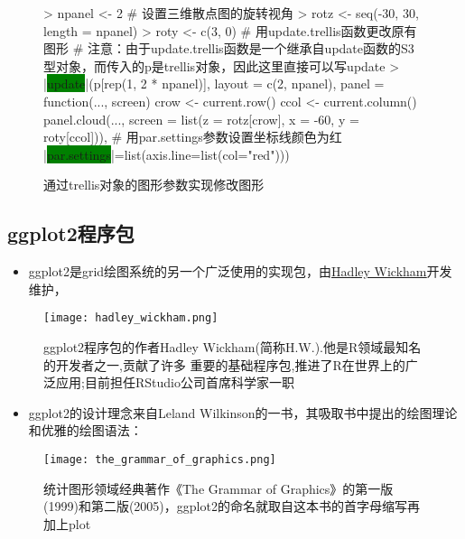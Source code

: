 \begin{frame}[t,fragile]{\subsecname}{\subsubsecname}
\begin{overlayarea}{\textwidth}{\textheight}
\begin{onlyenv}
\begin{figure}
\begin{columns}
    \begin{column}[c]{.6\textwidth}
\begin{rcode}
> npanel <- 2
# 设置三维散点图的旋转视角
> rotz <- seq(-30, 30, length = npanel)
> roty <- c(3, 0)
# 用update.trellis函数更改原有图形
# 注意：由于update.trellis函数是一个继承自update函数的S3型对象，而传入的p是trellis对象，因此这里直接可以写update
> |\colorbox{green}{update}|(p[rep(1, 2 * npanel)], 
         layout = c(2, npanel),
         panel = function(..., screen) {
           crow <- current.row()
           ccol <- current.column()
         panel.cloud(..., screen = list(z = rotz[crow], x = -60, y = roty[ccol]))},
         # 用par.settings参数设置坐标线颜色为红 
         |\colorbox{green}{par.settings}|=list(axis.line=list(col="red")))
\end{rcode}
    \end{column}
  \end{columns}
  \caption{通过trellis对象的图形参数实现修改图形}
\end{figure}
\end{onlyenv}
\end{overlayarea}
\end{frame}


\subsection{ggplot2程序包}
\begin{frame}[t]{\subsecname}{}
\begin{itemize}
\item ggplot2是grid绘图系统的另一个广泛使用的实现包，由\href{http://hadley.nz/}{\uline{Hadley Wickham}}开发维护， 
\end{itemize}
\begin{figure}[ht]
  \centering
  \texttt{[image: hadley\_wickham.png]}
  \caption{ggplot2程序包的作者Hadley Wickham(简称H.W.).他是R领域最知名的开发者之一,贡献了许多
重要的基础程序包,推进了R在世界上的广泛应用;目前担任RStudio公司首席科学家一职}
\end{figure}
\end{frame}

\begin{frame}[t]{\subsecname}{}
\begin{itemize}
\item ggplot2的设计理念来自Leland Wilkinson的一书，其吸取书中提出的绘图理论和优雅的绘图语法：
\end{itemize}
\begin{figure}[ht]
  \centering
  \texttt{[image: the\_grammar\_of\_graphics.png]}
  \caption{统计图形领域经典著作《The Grammar of Graphics》的第一版(1999)和第二版(2005)，ggplot2的命名就取自这本书的首字母缩写再加上plot}
\end{figure}
\end{frame}


